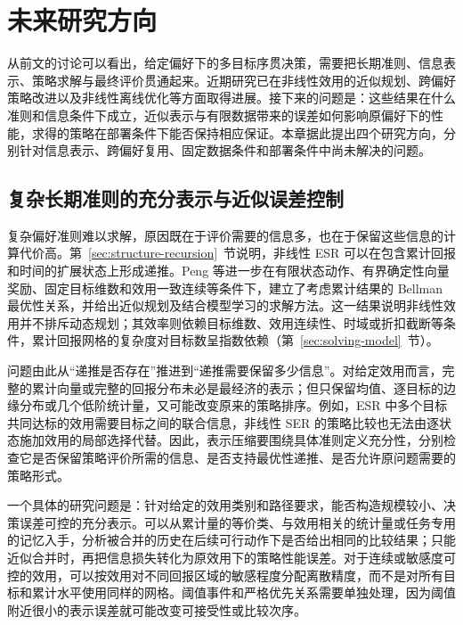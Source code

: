 \section{未来研究方向}\label{sec:future}

从前文的讨论可以看出，给定偏好下的多目标序贯决策，需要把长期准则、信息表示、策略求解与最终评价贯通起来。近期研究已在非线性效用的近似规划、跨偏好策略改进以及非线性离线优化等方面取得进展\cite{peng2025esr,alegre2026,kim2025fairdice,kim2026aetdice}。接下来的问题是：这些结果在什么准则和信息条件下成立，近似表示与有限数据带来的误差如何影响原偏好下的性能，求得的策略在部署条件下能否保持相应保证。本章据此提出四个研究方向，分别针对信息表示、跨偏好复用、固定数据条件和部署条件中尚未解决的问题。

\subsection{复杂长期准则的充分表示与近似误差控制}\label{sec:future-representation}

复杂偏好准则难以求解，原因既在于评价需要的信息多，也在于保留这些信息的计算代价高。第~\ref{sec:structure-recursion}~节说明，非线性 ESR 可以在包含累计回报和时间的扩展状态上形成递推。Peng 等进一步在有限状态动作、有界确定性向量奖励、固定目标维数和效用一致连续等条件下，建立了考虑累计结果的 Bellman 最优性关系，并给出近似规划及结合模型学习的求解方法\cite{peng2025esr}。这一结果说明非线性效用并不排斥动态规划；其效率则依赖目标维数、效用连续性、时域或折扣截断等条件，累计回报网格的复杂度对目标数呈指数依赖（第~\ref{sec:solving-model}~节）。

问题由此从“递推是否存在”推进到“递推需要保留多少信息”。对给定效用而言，完整的累计向量或完整的回报分布未必是最经济的表示；但只保留均值、逐目标的边缘分布或几个低阶统计量，又可能改变原来的策略排序。例如，ESR 中多个目标共同达标的效用需要目标之间的联合信息，非线性 SER 的策略比较也无法由逐状态施加效用的局部选择代替\cite{hayes2022,ropke2023}。因此，表示压缩要围绕具体准则定义充分性，分别检查它是否保留策略评价所需的信息、是否支持最优性递推、是否允许原问题需要的策略形式。

一个具体的研究问题是：针对给定的效用类别和路径要求，能否构造规模较小、决策误差可控的充分表示。可以从累计量的等价类、与效用相关的统计量或任务专用的记忆入手，分析被合并的历史在后续可行动作下是否给出相同的比较结果；只能近似合并时，再把信息损失转化为原效用下的策略性能误差。对于连续或敏感度可控的效用，可以按效用对不同回报区域的敏感程度分配离散精度，而不是对所有目标和累计水平使用同样的网格。阈值事件和严格优先关系需要单独处理，因为阈值附近很小的表示误差就可能改变可接受性或比较次序。


